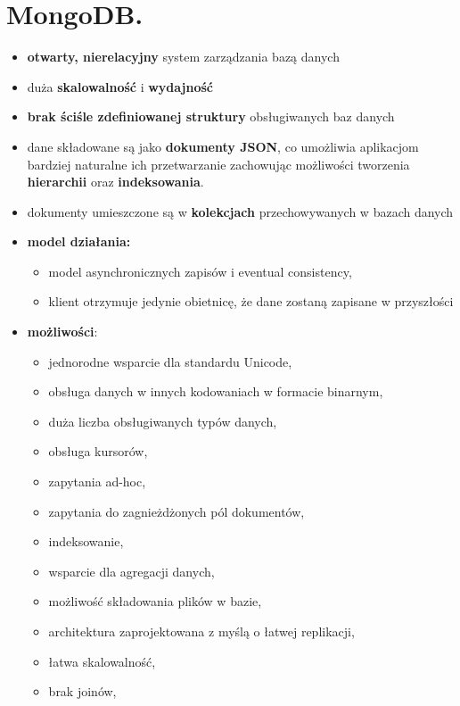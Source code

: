\documentclass[a4paper]{article}
\begin{document}
    \section{MongoDB.}
    \begin{itemize}
        \item \textbf{otwarty, nierelacyjny} system zarządzania bazą danych
        \item duża \textbf{skalowalność} i \textbf{wydajność}
        \item \textbf{brak ściśle zdefiniowanej struktury} obsługiwanych baz danych
        \item dane składowane są jako \textbf{dokumenty JSON}, co umożliwia aplikacjom bardziej naturalne ich przetwarzanie zachowując
        możliwości tworzenia \textbf{hierarchii} oraz \textbf{indeksowania}.
        \item dokumenty umieszczone są w \textbf{kolekcjach} przechowywanych w bazach danych
        \item \textbf{model działania:}
        \begin{itemize}
            \item model asynchronicznych zapisów i eventual consistency,
            \item klient otrzymuje jedynie obietnicę, że dane zostaną zapisane w przyszłości
        \end{itemize}
        \item \textbf{możliwości}:
        \begin{itemize}
            \item jednorodne wsparcie dla standardu Unicode,
            \item obsługa danych w innych kodowaniach w formacie binarnym,
            \item duża liczba obsługiwanych typów danych,
            \item obsługa kursorów,
            \item zapytania ad-hoc,
            \item zapytania do zagnieżdżonych pól dokumentów,
            \item indeksowanie,
            \item wsparcie dla agregacji danych,
            \item możliwość składowania plików w bazie,
            \item architektura zaprojektowana z myślą o łatwej replikacji,
            \item łatwa skalowalność,
            \item brak joinów,

\end{itemize}
\end{itemize}
\end{document}
